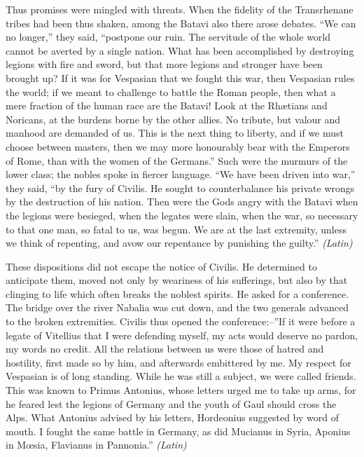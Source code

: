 
Thus promises were mingled with threats. When the fidelity of the Transrhenane tribes had been thus shaken, among the Batavi also there arose debates. ``We can no longer,'' they said, ``postpone our ruin. The servitude of the whole world cannot be averted by a single nation. What has been accomplished by destroying legions with fire and sword, but that more legions and stronger have been brought up? If it was for Vespasian that we fought this war, then Vespasian rules the world; if we meant to challenge to battle the Roman people, then what a mere fraction of the human race are the Batavi! Look at the Rhætians and Noricans, at the burdens borne by the other allies. No tribute, but valour and manhood are demanded of us. This is the next thing to liberty, and if we must choose between masters, then we may more honourably bear with the Emperors of Rome, than with the women of the Germans.'' Such were the murmurs of the lower class; the nobles spoke in fiercer language. ``We have been driven into war,'' they said, ``by the fury of Civilis. He sought to counterbalance his private wrongs by the destruction of his nation. Then were the Gods angry with the Batavi when the legions were besieged, when the legates were slain, when the war, so necessary to that one man, so fatal to us, was begun. We are at the last extremity, unless we think of repenting, and avow our repentance by punishing the guilty.'' \emph{(Latin)}


These dispositions did not escape the notice of Civilis. He determined to anticipate them, moved not only by weariness of his sufferings, but also by that clinging to life which often breaks the noblest spirits. He asked for a conference. The bridge over the river Nabalia was cut down, and the two generals advanced to the broken extremities. Civilis thus opened the conference:--''If it were before a legate of Vitellius that I were defending myself, my acts would deserve no pardon, my words no credit. All the relations between us were those of hatred and hostility, first made so by him, and afterwards embittered by me. My respect for Vespasian is of long standing. While he was still a subject, we were called friends. This was known to Primus Antonius, whose letters urged me to take up arms, for he feared lest the legions of Germany and the youth of Gaul should cross the Alps. What Antonius advised by his letters, Hordeonius suggested by word of mouth. I fought the same battle in Germany, as did Mucianus in Syria, Aponius in Mœsia, Flavianus in Pannonia.'' \emph{(Latin)}

